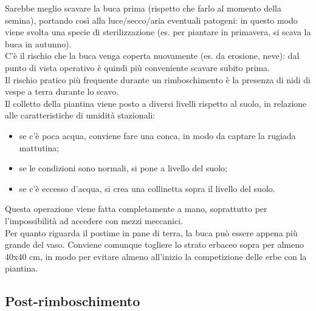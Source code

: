 Sarebbe meglio scavare la buca prima (rispetto che farlo al momento della semina), portando così alla luce/secco/aria eventuali patogeni: in questo modo viene svolta una specie di sterilizzazione (es. per piantare in primavera, si scava la buca in autunno).\\
C'è il rischio che la buca venga coperta nuovamente (es. da erosione, neve): dal punto di vista operativo è quindi più conveniente scavare subito prima.\\
Il rischio pratico più frequente durante un rimboschimento è la presenza di nidi di vespe a terra durante lo scavo.\\
Il colletto della piantina viene posto a diversi livelli rispetto al suolo, in relazione alle caratteristiche di umidità stazionali:
\begin{itemize}[nosep]
    \item se c'è poca acqua, conviene fare una conca, in modo da captare la rugiada mattutina;
    \item se le condizioni sono normali, si pone a livello del suolo;
    \item se c'è eccesso d'acqua, si crea una collinetta sopra il livello del suolo.
\end{itemize} 
Questa operazione viene fatta completamente a mano, soprattutto per l'impossibilità ad accedere con mezzi meccanici.\\
Per quanto riguarda il postime in pane di terra, la buca può essere appena più grande del vaso. Conviene comunque togliere lo strato erbaceo sopra per almeno 40x40 cm, in modo per evitare almeno all'inizio la competizione delle erbe con la piantina.
\subsection{Post-rimboschimento}
